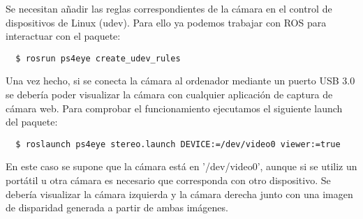 Se necesitan añadir las reglas correspondientes de la cámara en el control de
dispositivos de Linux (udev). Para ello ya podemos trabajar con ROS para
interactuar con el paquete:
\\
\begin{lstlisting}
  $ rosrun ps4eye create_udev_rules
\end{lstlisting}

Una vez hecho, si se conecta la cámara al ordenador mediante un puerto USB 3.0
se debería poder visualizar la cámara con cualquier aplicación de captura de
cámara web. Para comprobar el funcionamiento ejecutamos el siguiente launch del
paquete:
\\
\begin{lstlisting}
  $ roslaunch ps4eye stereo.launch DEVICE:=/dev/video0 viewer:=true
\end{lstlisting}

En este caso se supone que la cámara está en '/dev/video0', aunque si se utiliz
un portátil u otra cámara es necesario que corresponda con otro dispositivo. Se
debería visualizar la cámara izquierda y la cámara derecha junto con una imagen
de disparidad generada a partir de ambas imágenes.

